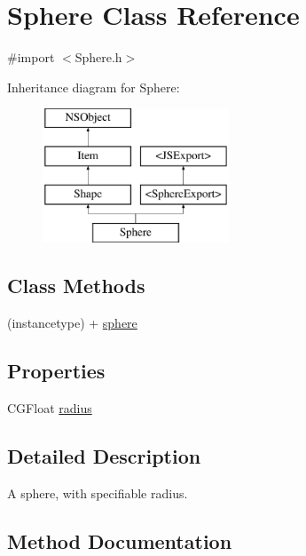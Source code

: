 \hypertarget{interface_sphere}{}\section{Sphere Class Reference}
\label{interface_sphere}


{\ttfamily \#import $<$Sphere.\+h$>$}

Inheritance diagram for Sphere\+:\begin{figure}[H]
\begin{center}
\leavevmode
\includegraphics[height=4.000000cm]{interface_sphere}
\end{center}
\end{figure}
\subsection*{Class Methods}
\begin{DoxyCompactItemize}
\item 
(instancetype) + \hyperlink{interface_sphere_afb98b7d334085032d8b6abe92e177042}{sphere}
\end{DoxyCompactItemize}
\subsection*{Properties}
\begin{DoxyCompactItemize}
\item 
C\+G\+Float \hyperlink{interface_sphere_a090461fb4ad74477e21bc732b88fd7e9}{radius}
\end{DoxyCompactItemize}


\subsection{Detailed Description}
A sphere, with specifiable radius. 

\subsection{Method Documentation}
\hypertarget{interface_sphere_afb98b7d334085032d8b6abe92e177042}{}

